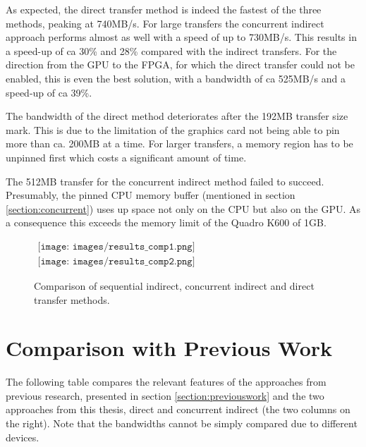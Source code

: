 As expected, the direct transfer method is indeed the fastest of the three methods, peaking at 740MB/s.
For large transfers the concurrent indirect approach performs almost as well with a speed of up to 730MB/s.
This results in a speed-up of ca 30\% and 28\% compared with the indirect transfers.
For the direction from the GPU to the FPGA, for which the direct transfer could not be enabled, this is even the best solution, with a bandwidth of ca 525MB/s and a speed-up of ca 39\%.



The bandwidth of the direct method deteriorates after the 192MB transfer size mark.
This is due to the limitation of the graphics card not being able to pin more than ca. 200MB at a time.
For larger transfers, a memory region has to be unpinned first which costs a significant amount of time.

The 512MB transfer for the concurrent indirect method failed to succeed.
Presumably, the pinned CPU memory buffer (mentioned in section \ref{section:concurrent}) uses up space not only on the CPU but also on the GPU.
As a consequence this exceeds the memory limit of the Quadro K600 of 1GB.




\begin{figure}[h]
\begin{center}
$
\begin{array}{cc}
\texttt{[image: images/results\_comp1.png]} \\
\texttt{[image: images/results\_comp2.png]}
\end{array}
$
\end{center}
\caption{Comparison of sequential indirect, concurrent indirect and direct transfer methods.}
\label{fig:results_comparison}
\end{figure}




\section{Comparison with Previous Work}
\label{section:previousworkcomparison}

The following table compares the relevant features of the approaches from previous research, presented in section \ref{section:previouswork} and the two approaches from this thesis, direct and concurrent indirect (the two columns on the right).
Note that the bandwidths cannot be simply compared due to different devices.


